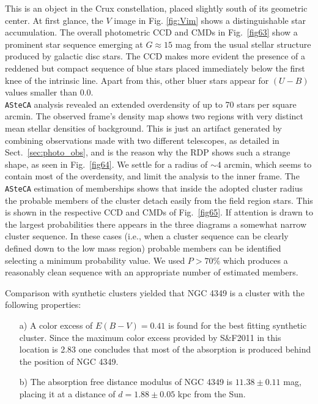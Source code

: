 \documentclass[draft]{aa}
\begin{document}
This is an object in the Crux constellation, placed slightly south of its
geometric center. At first glance, the $V$ image in Fig. \ref{fig:Vim} shows a
distinguishable star accumulation. The overall photometric CCD and CMDs in
Fig.~\ref{fig63} show a prominent star sequence emerging at $G\approx15$ mag
from the usual stellar structure produced by galactic disc stars.
The CCD makes more evident the presence of a reddened but compact sequence of
blue stars placed immediately below the first knee of the intrinsic line. Apart
from this, other bluer stars appear for $(U-B)$ values smaller than 0.0.\\ 

\texttt{ASteCA} analysis revealed an extended overdensity of up to 70 stars per
square arcmin. The observed frame's density map shows two regions with
very distinct mean stellar densities of background. This is just an artifact
generated by combining observations made with two different telescopes, as
detailed in Sect.~\ref{sec:photo_obs}, and is the reason why
the RDP shows such a strange shape, as seen in Fig.~\ref{fig64}. We
settle for a radius of $\sim4$ arcmin, which seems to contain most of the
overdensity, and limit the analysis to the inner frame.
%
The \texttt{ASteCA} estimation of memberships shows that inside the adopted
cluster radius the probable members of the cluster detach easily from the field
region stars. This is shown in the respective CCD and CMDs of Fig.~\ref{fig65}.
If attention is drawn to the largest probabilities there appears in the three
diagrams a somewhat narrow cluster sequence.
In these cases (i.e., when a cluster sequence can be clearly defined
down to the low mass region) probable members can be identified selecting a
minimum probability value. We used $P>70\%$ which produces a reasonably clean
sequence with an appropriate number of estimated members.
%
%

Comparison with synthetic clusters yielded that NGC 4349 is a cluster with the
following properties:

\begin{itemize}
\item [a)] A color excess of $E(B-V)=0.41$ is found for the best
fitting synthetic cluster. Since the maximum color excess provided by
S\&F2011 in this location is 2.83 one concludes that most of the
absorption is produced behind the position of NGC 4349.
\item [b)] The absorption free distance modulus of NGC 4349 is
$11.38\pm0.11$ mag, placing it at a distance of $d=1.88\pm0.05$ kpc from
the Sun.
\end{itemize}
\end{document}
